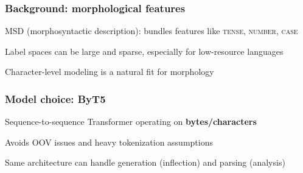 
\begin{frame}
    \frametitle{Background: morphological features}
    \begin{PraesentationAufzaehlung}
        \item MSD (morphosyntactic description): bundles features like \textsc{tense}, \textsc{number}, \textsc{case}
        \item Label spaces can be large and sparse, especially for low-resource languages
        \item Character-level modeling is a natural fit for morphology
    \end{PraesentationAufzaehlung}
\end{frame}

\begin{frame}
    \frametitle{Model choice: ByT5}
    \begin{PraesentationAufzaehlung}
        \item Sequence-to-sequence Transformer operating on \textbf{bytes/characters}
        \item Avoids OOV issues and heavy tokenization assumptions
        \item Same architecture can handle generation (inflection) and parsing (analysis)
    \end{PraesentationAufzaehlung}
\end{frame}
